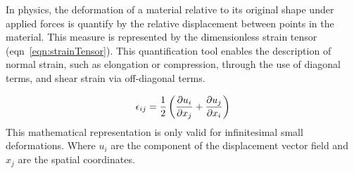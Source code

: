 In physics, the deformation of a material relative to its original shape under applied forces is quantify by the relative displacement between points in the material.
This measure is represented by the dimensionless strain tensor (eqn~\eqref{eqn:strainTensor}).
This quantification tool enables the description of normal strain, such as elongation or compression, through the use of diagonal terms, and shear strain via off-diagonal terms.

\begin{gather}
    \epsilon_{ij} = \frac{1}{2}\left( \pdv{u_i}{x_j}+\pdv{u_j}{x_i} \right)\label{eqn:strainTensor}
\end{gather}
This mathematical representation is only valid for infinitesimal small deformations.
Where $u_i$ are the component of the displacement vector field and $x_j$ are the spatial coordinates.

